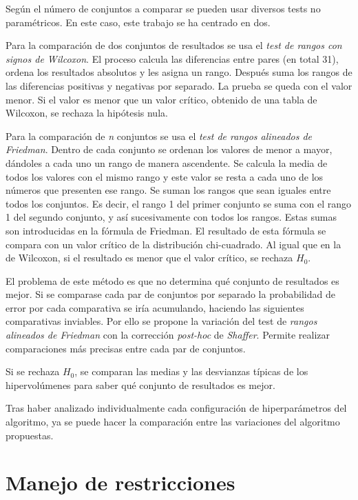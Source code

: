 Según el número de conjuntos a comparar se pueden usar diversos tests no paramétricos. En este caso, este trabajo se ha centrado en dos.

Para la comparación de dos conjuntos de resultados se usa el \textit{test de rangos con signos de Wilcoxon}. El proceso calcula las diferencias entre pares (en total 31), ordena los resultados absolutos y les asigna un rango. Después suma los rangos de las diferencias positivas y negativas por separado. La prueba se queda con el valor menor. Si el valor es menor que un valor crítico, obtenido de una tabla de Wilcoxon, se rechaza la hipótesis nula.~\cite{scipy2024wilcoxon}

Para la comparación de \textit{n} conjuntos se usa el \textit{test de rangos alineados de Friedman}. Dentro de cada conjunto se ordenan los valores de menor a mayor, dándoles a cada uno un rango de manera ascendente. Se calcula la media de todos los valores con el mismo rango y este valor se resta a cada uno de los números que presenten ese rango. Se suman los rangos que sean iguales entre todos los conjuntos. Es decir, el rango 1 del primer conjunto se suma con el rango 1 del segundo conjunto, y así sucesivamente con todos los rangos. Estas sumas son introducidas en la fórmula de Friedman. El resultado de esta fórmula se compara con un valor crítico de la distribución chi-cuadrado. Al igual que en la de Wilcoxon, si el resultado es menor que el valor crítico, se rechaza \(H_0\).~\cite{stac2024friedman}

El problema de este método es que no determina qué conjunto de resultados es mejor. Si se comparase cada par de conjuntos por separado la probabilidad de error por cada comparativa se iría acumulando, haciendo las siguientes comparativas inviables. Por ello se propone la variación del test de \textit{rangos alineados de Friedman} con la corrección \textit{post-hoc} de \textit{Shaffer}. Permite realizar comparaciones más precisas entre cada par de conjuntos.~\cite{stac2024shaffer}

Si se rechaza \(H_0\), se comparan las medias y las desvianzas típicas de los hipervolúmenes para saber qué conjunto de resultados es mejor.

Tras haber analizado individualmente cada configuración de hiperparámetros del algoritmo, ya se puede hacer la comparación entre las variaciones del algoritmo propuestas.

\section{Manejo de restricciones}
\label{ch:manejo-restricciones-experimentacion}

